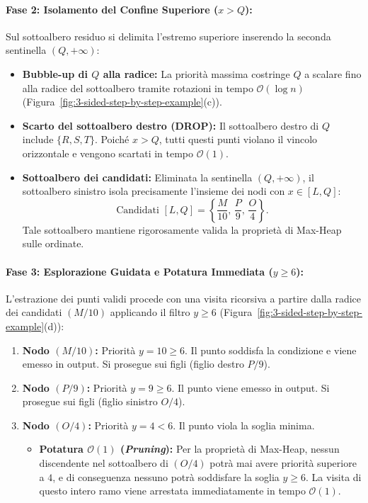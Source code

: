 \paragraph{Fase 2: Isolamento del Confine Superiore ($x > Q$):}
Sul sottoalbero residuo si delimita l'estremo superiore inserendo la seconda sentinella $(Q, +\infty)$:
\begin{itemize}
    \item \textbf{Bubble-up di $Q$ alla radice:} La priorit\`a massima costringe $Q$ a scalare fino alla radice del sottoalbero tramite rotazioni in tempo $\mathcal{O}(\log n)$ (Figura~\ref{fig:3-sided-step-by-step-example}(c)).
    \item \textbf{Scarto del sottoalbero destro (DROP):} Il sottoalbero destro di $Q$ include $\{R, S, T\}$. Poich\'e $x > Q$, tutti questi punti violano il vincolo orizzontale e vengono scartati in tempo $\mathcal{O}(1)$.
    \item \textbf{Sottoalbero dei candidati:} Eliminata la sentinella $(Q, +\infty)$, il sottoalbero sinistro isola precisamente l'insieme dei nodi con $x \in [L, Q]$:
    \begin{equation}
      \text{Candidati } [L, Q] = \left\{ \frac{M}{10}, \, \frac{P}{9}, \, \frac{O}{4} \right\}.
    \end{equation}
    Tale sottoalbero mantiene rigorosamente valida la propriet\`a di Max-Heap sulle ordinate.
\end{itemize}

\paragraph{Fase 3: Esplorazione Guidata e Potatura Immediata ($y \ge 6$):}
L'estrazione dei punti validi procede con una visita ricorsiva a partire dalla radice dei candidati $(M / 10)$ applicando il filtro $y \ge 6$ (Figura~\ref{fig:3-sided-step-by-step-example}(d)):
\begin{enumerate}
    \item \textbf{Nodo $(M / 10)$:} Priorit\`a $y = 10 \ge 6$. Il punto soddisfa la condizione e viene emesso in output. Si prosegue sui figli (figlio destro $P / 9$).
    \item \textbf{Nodo $(P / 9)$:} Priorit\`a $y = 9 \ge 6$. Il punto viene emesso in output. Si prosegue sui figli (figlio sinistro $O / 4$).
    \item \textbf{Nodo $(O / 4)$:} Priorit\`a $y = 4 < 6$. Il punto viola la soglia minima.
    \begin{itemize}
        \item \textbf{Potatura $\mathcal{O}(1)$ (\textit{Pruning}):} Per la propriet\`a di Max-Heap, nessun discendente nel sottoalbero di $(O / 4)$ potr\`a mai avere priorit\`a superiore a $4$, e di conseguenza nessuno potr\`a soddisfare la soglia $y \ge 6$. La visita di questo intero ramo viene arrestata immediatamente in tempo $\mathcal{O}(1)$.
    \end{itemize}
\end{enumerate}

